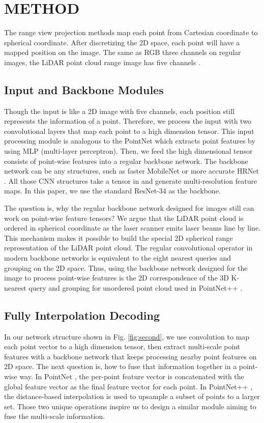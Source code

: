 \documentclass[letterpaper, 10 pt, conference]{ieeeconf}
\begin{document}
\section{METHOD}


The range view projection methods map each point from  Cartesian coordinate to  spherical coordinate. After discretizing the 2D  space, each point will have a mapped position on the  image. The same as RGB three channels on regular images, the LiDAR point cloud range image has five channels .


\subsection{Input and Backbone Modules}
Though the input is like a 2D image with five channels, each position still represents the information of a point. Therefore, we process the input with two  convolutional layers that map each point to a high dimension tensor. This input processing module is analogous to the PointNet \cite{qi2017pointnet} which extracts point features by using MLP (multi-layer perceptron). Then, we feed the high dimensional tensor consists of point-wise features into a regular backbone network. The backbone network can be any structures, such as faster MobileNet \cite{howard2019searching} or more accurate HRNet \cite{wang2020deep}. All those CNN structures take a tensor in and generate multi-resolution feature maps. In this paper, we use the standard ResNet-34 \cite{he2016deep} as the backbone.

The question is, why the regular backbone network designed for images still can work on point-wise feature tensors? We argue that the LiDAR point cloud is ordered in spherical coordinate as the laser scanner emits laser beams line by line. This mechanism makes it possible to build the special 2D spherical range representation of the LiDAR point cloud. The regular  convolutional operator in modern backbone networks is equivalent to the eight nearest queries and grouping on the 2D  space. Thus, using the backbone network designed for the image to process point-wise features is the 2D correspondence of the 3D K-nearest query and grouping for unordered point cloud used in PointNet++ \cite{qi2017pointnet++}.

\subsection{Fully Interpolation Decoding}
In our network structure shown in Fig. \ref{fig:second}, we use  convolution to map each point vector to a high dimension tensor, then extract multi-scale point features with a backbone network that keeps processing nearby point features on 2D  space. The next question is, how to fuse that information together in a point-wise way. In PointNet \cite{qi2017pointnet}, the per-point feature vector is concatenated with the global feature vector as the final feature vector for each point. In PointNet++ \cite{qi2017pointnet++}, the distance-based interpolation is used to upsample a subset of points to a larger set. Those two unique operations inspire us to design a similar module aiming to fuse the multi-scale information.
\end{document}
